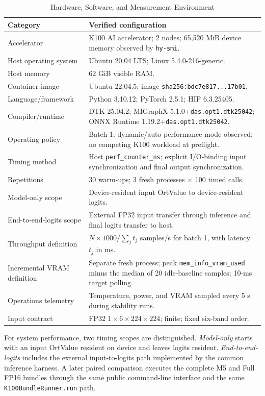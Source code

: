 \documentclass[conference]{IEEEtran}
\begin{document}
\begin{table}[t]
\caption{Hardware, Software, and Measurement Environment}
\label{tab:environment}
\centering
\footnotesize
\begin{tabularx}{\textwidth}{>{\raggedright\arraybackslash}p{} X}
\toprule
Category & Verified configuration \\
\midrule
Accelerator & K100 AI accelerator; 2 nodes; 65,520 MiB device memory observed by \texttt{hy-smi}. \\
Host operating system & Ubuntu 20.04 LTS; Linux 5.4.0-216-generic. \\
Host memory & 62 GiB visible RAM. \\
Container image & Ubuntu 22.04.5; image \texttt{sha256:bdc7e817...17b01}. \\
Language/framework & Python 3.10.12; PyTorch 2.5.1; HIP 6.3.25405. \\
Compiler/runtime & DTK 25.04.2; MIGraphX 5.1.0+\texttt{das.opt1.dtk25042}; ONNX Runtime 1.19.2+\texttt{das.opt1.dtk25042}. \\
Operating policy & Batch 1; dynamic/auto performance mode observed; no competing K100 workload at preflight. \\
Timing method & Host \texttt{perf\_counter\_ns}; explicit I/O-binding input synchronization and final output synchronization. \\
Repetitions & 30 warm-ups; 3 fresh processes $\times$ 100 timed calls. \\
Model-only scope & Device-resident input OrtValue to device-resident logits. \\
End-to-end-logits scope & External FP32 input transfer through inference and final logits transfer to host. \\
Throughput definition & $N\times1000/\sum_j t_j$ samples/s for batch 1, with latency $t_j$ in ms. \\
Incremental VRAM definition & Separate fresh process; peak \texttt{mem\_info\_vram\_used} minus the median of 20 idle-baseline samples; 10-ms target polling. \\
Operations telemetry & Temperature, power, and VRAM sampled every 5 s during stability runs. \\
Input contract & FP32 $1\times6\times224\times224$; finite; fixed six-band order. \\
\bottomrule
\end{tabularx}
\end{table}

For system performance, two timing scopes are distinguished. \textit{Model-only} starts with an input OrtValue resident on device and leaves logits resident. \textit{End-to-end-logits} includes the external input-to-logits path implemented by the common inference harness. A later paired comparison executes the complete M5 and Full FP16 bundles through the same public command-line interface and the same \texttt{K100BundleRunner.run} path.
\end{document}
